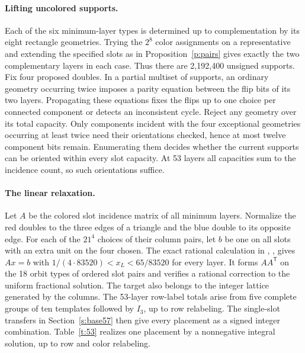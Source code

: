 \documentclass[11pt]{article}
\begin{document}
\paragraph{Lifting uncolored supports.}
Each of the six minimum-layer types is determined up to complementation by its eight rectangle geometries. Trying the $2^8$ color assignments on a representative and extending the specified slots as in Proposition~\ref{p:pairs} gives exactly the two complementary layers in each case. Thus there are 2,192,400 unsigned supports. Fix four proposed doubles. In a partial multiset of supports, an ordinary geometry occurring twice imposes a parity equation between the flip bits of its two layers. Propagating these equations fixes the flips up to one choice per connected component or detects an inconsistent cycle. Reject any geometry over its total capacity. Only components incident with the four exceptional geometries occurring at least twice need their orientations checked, hence at most twelve component bits remain. Enumerating them decides whether the current supports can be oriented within every slot capacity. At 53 layers all capacities sum to the incidence count, so such orientations suffice.

\paragraph{The linear relaxation.}
Let $A$ be the colored slot incidence matrix of all minimum layers. Normalize the red doubles to the three edges of a triangle and the blue double to its opposite edge. For each of the $21^4$ choices of their column pairs, let $b$ be one on all slots with an extra unit on the four chosen. The exact rational calculation in \cite{data}, , gives $Ax=b$ with $1/(4\cdot83520)<x_L<65/83520$ for every layer. It forms $AA^{\mathsf T}$ on the 18 orbit types of ordered slot pairs and verifies a rational correction to the uniform fractional solution. The target also belongs to the integer lattice generated by the columns. The 53-layer row-label totals arise from five complete groups of ten templates followed by $I_3$, up to row relabeling. The single-slot transfers in Section~\ref{s:base57} then give every placement as a signed integer combination. Table~\ref{t:53} realizes one placement by a nonnegative integral solution, up to row and color relabeling.
\end{document}
